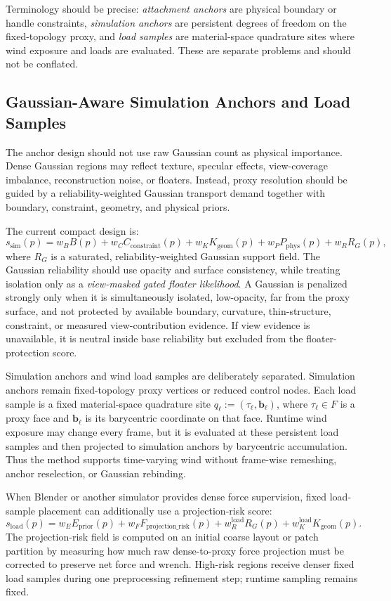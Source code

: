 \documentclass[11pt]{article}
\begin{document}
Terminology should be precise: \emph{attachment anchors} are physical boundary or handle constraints, \emph{simulation anchors} are persistent degrees of freedom on the fixed-topology proxy, and \emph{load samples} are material-space quadrature sites where wind exposure and loads are evaluated. These are separate problems and should not be conflated.

\subsection*{Gaussian-Aware Simulation Anchors and Load Samples}

The anchor design should not use raw Gaussian count as physical importance. Dense Gaussian regions may reflect texture, specular effects, view-coverage imbalance, reconstruction noise, or floaters. Instead, proxy resolution should be guided by a reliability-weighted Gaussian transport demand together with boundary, constraint, geometry, and physical priors.

The current compact design is:
\[
  s_{\mathrm{sim}}(p)
  =
  w_B B(p)
  +
  w_C C_{\mathrm{constraint}}(p)
  +
  w_K K_{\mathrm{geom}}(p)
  +
  w_P P_{\mathrm{phys}}(p)
  +
  w_R R_G(p),
\]
where \(R_G\) is a saturated, reliability-weighted Gaussian support field. The Gaussian reliability should use opacity and surface consistency, while treating isolation only as a \emph{view-masked gated floater likelihood}. A Gaussian is penalized strongly only when it is simultaneously isolated, low-opacity, far from the proxy surface, and not protected by available boundary, curvature, thin-structure, constraint, or measured view-contribution evidence. If view evidence is unavailable, it is neutral inside base reliability but excluded from the floater-protection score.

Simulation anchors and wind load samples are deliberately separated. Simulation anchors remain fixed-topology proxy vertices or reduced control nodes. Each load sample is a fixed material-space quadrature site \(q_\ell := (\tau_\ell,\mathbf{b}_\ell)\), where \(\tau_\ell\in F\) is a proxy face and \(\mathbf{b}_\ell\) is its barycentric coordinate on that face. Runtime wind exposure may change every frame, but it is evaluated at these persistent load samples and then projected to simulation anchors by barycentric accumulation. Thus the method supports time-varying wind without frame-wise remeshing, anchor reselection, or Gaussian rebinding.

When Blender or another simulator provides dense force supervision, fixed load-sample placement can additionally use a projection-risk score:
\[
  s_{\mathrm{load}}(p)
  =
  w_E E_{\mathrm{prior}}(p)
  +
  w_F F_{\mathrm{projection\_risk}}(p)
  +
  w_R^{\mathrm{load}}R_G(p)
  +
  w_K^{\mathrm{load}}K_{\mathrm{geom}}(p).
\]
The projection-risk field is computed on an initial coarse layout or patch partition by measuring how much raw dense-to-proxy force projection must be corrected to preserve net force and wrench. High-risk regions receive denser fixed load samples during one preprocessing refinement step; runtime sampling remains fixed.
\end{document}
